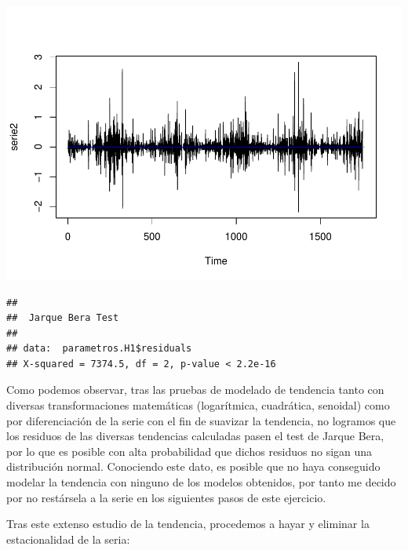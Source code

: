 \documentclass[]{article}
\newenvironment{Shaded}{\begin{snugshade}}{\end{snugshade}}
\newcommand{\KeywordTok}[1]{\textcolor[rgb]{0.13,0.29,0.53}{\textbf{#1}}}
\newcommand{\DecValTok}[1]{\textcolor[rgb]{0.00,0.00,0.81}{#1}}
\newcommand{\StringTok}[1]{\textcolor[rgb]{0.31,0.60,0.02}{#1}}
\newcommand{\CommentTok}[1]{\textcolor[rgb]{0.56,0.35,0.01}{\textit{#1}}}
\newcommand{\OperatorTok}[1]{\textcolor[rgb]{0.81,0.36,0.00}{\textbf{#1}}}
\newcommand{\NormalTok}[1]{#1}
\begin{document}
\includegraphics{timeSeries_files/figure-latex/unnamed-chunk-54-1.pdf}

\begin{Shaded}
\end{Shaded}

\begin{verbatim}
## 
##  Jarque Bera Test
## 
## data:  parametros.H1$residuals
## X-squared = 7374.5, df = 2, p-value < 2.2e-16
\end{verbatim}

Como podemos observar, tras las pruebas de modelado de tendencia tanto
con diversas transformaciones matemáticas (logarítmica, cuadrática,
senoidal) como por diferenciación de la serie con el fin de suavizar la
tendencia, no logramos que los residuos de las diversas tendencias
calculadas pasen el test de Jarque Bera, por lo que es posible con alta
probabilidad que dichos residuos no sigan una distribución normal.
Conociendo este dato, es posible que no haya conseguido modelar la
tendencia con ninguno de los modelos obtenidos, por tanto me decido por
no restársela a la serie en los siguientes pasos de este ejercicio.

Tras este extenso estudio de la tendencia, procedemos a hayar y eliminar
la estacionalidad de la seria:

\begin{Shaded}
\end{Shaded}
\end{document}
